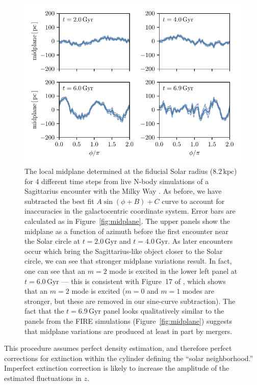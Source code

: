 \documentclass[twocolumn]{aastex62}
\newcommand{\kpc}{\text{kpc}}
\newcommand{\Gyr}{\text{Gyr}}
\begin{document}
\begin{figure}[htb!]
\begin{center}
\includegraphics[width=342.078286667pt]{fig/midplane_fit_chervinsim.pdf}
\end{center}
\caption{The local midplane determined at the fiducial Solar radius
($8.2\,\kpc$) for 4 different time steps from live N-body simulations of a
Sagittarius encounter with the Milky Way \citep{2018MNRAS.481..286L}. As
before, we have subtracted the best fit $A\sin{(\phi+B)}+C$ curve to account
for inaccuracies in the galactocentric coordinate system. Error bars are
calculated as in Figure~\ref{fig:midplane}. The upper panels
show the midplane as a function of azimuth before the first encounter near the
Solar circle at $t=2.0\,\Gyr$ and $t=4.0\,\Gyr$. As later encounters occur
which bring the Sagittarius-like object closer to the Solar circle, we can see
that stronger midplane variations result. In fact, one can see that an $m=2$
mode is excited in the lower left panel at $t=6.0\,\Gyr$ --- this is
consistent with Figure~17 of \citet{2018MNRAS.481..286L}, which shows that an
$m=2$ mode is excited ($m=0$ and $m=1$ modes are stronger, but these
are removed in our sine-curve subtraction). The fact that the $t=6.9\,\Gyr$
panel looks qualitatively similar to the panels from the FIRE simulations
(Figure~\ref{fig:midplane}) suggests that midplane variations are
produced at least in part by mergers.}
\label{fig:midplane_chervin}
\end{figure}

This procedure assumes perfect density estimation, and therefore perfect
corrections for extinction within the cylinder defining the ``solar
neighborhood.'' Imperfect extinction correction is likely to increase the
amplitude of the estimated fluctuations in $z$.
\end{document}
